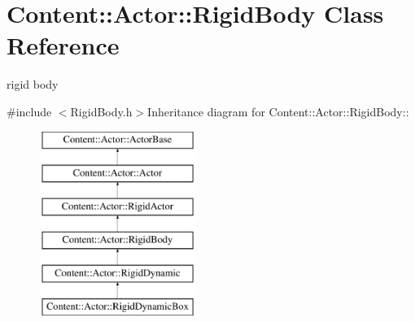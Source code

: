 \hypertarget{classContent_1_1Actor_1_1RigidBody}{
\section{Content::Actor::RigidBody Class Reference}
\label{classContent_1_1Actor_1_1RigidBody}
}


rigid body  


{\ttfamily \#include $<$RigidBody.h$>$}Inheritance diagram for Content::Actor::RigidBody::\begin{figure}[H]
\begin{center}
\leavevmode
\includegraphics[height=6cm]{classContent_1_1Actor_1_1RigidBody}
\end{center}
\end{figure}

